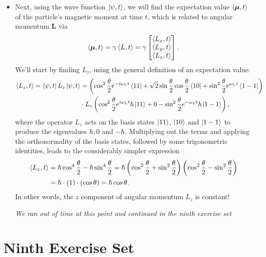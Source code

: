 \documentclass[11pt, a4paper]{article}
\renewcommand{\vec}[1]{\bm{#1}} %
\newcommand{\m}{\vec{\mu}}  %
\begin{document}
\begin{itemize}
	\item Next, using the wave function $ \ket{\psi, t} $, we will find the expectation value $ \ev{\m, t} $ of the particle's magnetic moment at time $ t $, which is related to angular momentum $ \vec{L} $ via
	\begin{equation*}
		\ev{\m, t} = \gamma \ev{L, t} = \gamma
		\begin{bmatrix}
			\ev{L_{x}, t}\\
			\ev{L_{y}, t}\\
			\ev{L_{z}, t}
		\end{bmatrix}.
	\end{equation*}
	We'll start by finding $ L_{z} $, using the general definition of an expectation value:
	\begin{align*}
		\ev{L_{z}, t} = \bra{\psi, t}L_{z}\ket{\psi, t} &= \left(\cos^{2} \frac{\theta}{2} e^{-i \omega_{L} t}\bra{11} + \sqrt{2}\sin \frac{\theta}{2} \cos \frac{\theta}{2} \bra{10} + \sin^{2}\frac{\theta}{2} e^{\omega_{L} t}\bra{1 -1}\right) \\
		&\cdot L_{z}\left(\cos^{2} \frac{\theta}{2} e^{i \omega_{L} t}\hbar\ket{11} + 0 - \sin^{2}\frac{\theta}{2} e^{-\omega_{L} t}\hbar\ket{1 -1}\right),
	\end{align*}
	where the operator $ L_{z} $ acts on the basis states $ \ket{11} $, $ \ket{10} $ and $ \ket{1-1} $ to produce the eigenvalues $ \hbar, 0 $ and $ -\hbar $. Multiplying out the terms and applying the orthonormality of the basis states, followed by some trigonometric identities, leads to the considerably simpler expression
	\begin{align*}
		\ev{L_{z}, t} &= \hbar \cos^{4}\frac{\theta}{2} - \hbar \sin^{4}\frac{\theta}{2} = \hbar\left(\cos^{2}\frac{\theta}{2} +  \sin^{2}\frac{\theta}{2}\right)\left(\cos^{2}\frac{\theta}{2} -  \sin^{2}\frac{\theta}{2}\right)\\
		&=\hbar\cdot (1) \cdot (\cos \theta) = \hbar \cos \theta.
	\end{align*}
	In other words, the $ z $ component of angular momentum $ L_{z} $ is constant!
	
	\textit{We ran out of time at this point and continued in the ninth exercise set}
	
\end{itemize}

\section{Ninth Exercise Set}
\end{document}
